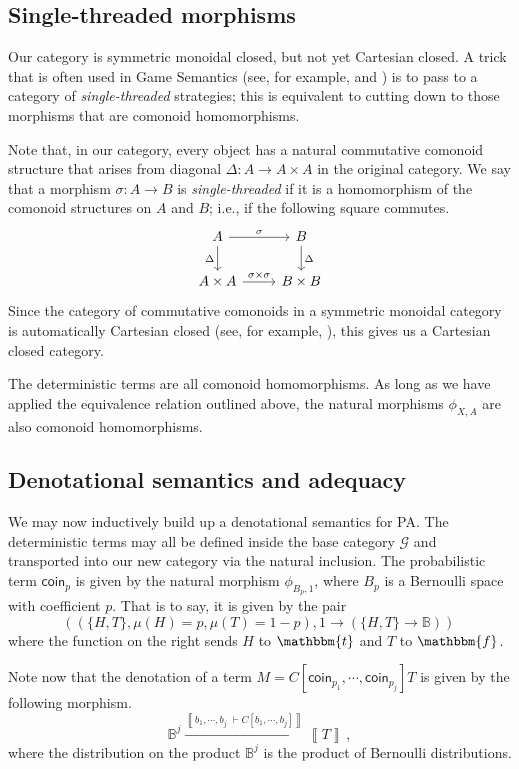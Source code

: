 \documentclass{svproc}
\newcommand{\deno}[1]{\left\llbracket#1\right\rrbracket}
\renewcommand{\ts}{{\;\vdash}}
\newcommand\G{\mathcal{G}}
\newcommand*\from{\colon}
\newcommand{\0}{{\mathtt{0}}} \newcommand{\com}{{\mathtt{com}}}
\newcommand{\true}{\mathbbm{t}}
\newcommand{\false}{\mathbbm{f}}
\newcommand{\bB}{\mathbb{B}}
\newcommand{\coin}{\textsf{coin}}
\begin{document}
\subsection{Single-threaded morphisms}

Our category is symmetric monoidal closed, but not yet Cartesian closed.  
A trick that is often used in Game Semantics (see, for example, \cite{mcCHFiniteND} and \cite{DanosHarmer}) is to pass to a category of \emph{single-threaded} strategies; this is equivalent to cutting down to those morphisms that are comonoid homomorphisms.  

Note that, in our category, every object has a natural commutative comonoid structure that arises from diagonal $\Delta\from A\to A\times A$ in the original category.  
We say that a morphism $\sigma\from A\to B$ is \emph{single-threaded} if it is a homomorphism of the comonoid structures on $A$ and $B$; i.e., if the following square commutes.
\[
  \begin{tikzcd}
    A \arrow[r, "\sigma"] \arrow[d, "\Delta"']
      & B \arrow[d, "\Delta"] \\
    A \times A \arrow[r, "\sigma\times\sigma"]
      & B \times B
  \end{tikzcd}
  \]
Since the category of commutative comonoids in a symmetric monoidal category is automatically Cartesian closed (see, for example, \cite{Freyd}), this gives us a Cartesian closed category.

The deterministic terms are all comonoid homomorphisms.  
As long as we have applied the equivalence relation outlined above, the natural morphisms $\phi_{X,A}$ are also comonoid homomorphisms.

\subsection{Denotational semantics and adequacy}

We may now inductively build up a denotational semantics for PA.  
The deterministic terms may all be defined inside the base category $\G$ and transported into our new category via the natural inclusion.  
The probabilistic term $\coin_p$ is given by the natural morphism $\phi_{B_p, 1}$, where $B_p$ is a Bernoulli space with coefficient $p$.  
That is to say, it is given by the pair
\[
  ((\{H,T\}, \mu(H)=p, \mu(T)=1-p), 1 \to (\{H,T\} \to \bB))\,
  \]
where the function on the right sends $H$ to $\true$ and $T$ to $\false$.

Note now that the denotation of a term $M = C[\coin_{p_1},\cdots,\coin_{p_j}]T$ is given by the following morphism.
\[
  \bB^j
  \xrightarrow{\deno{b_1,\cdots,b_j\ts C[b_1,\cdots,b_j]}}
  \deno{T}\,,
  \]
where the distribution on the product $\bB^j$ is the product of Bernoulli distributions.
\end{document}
